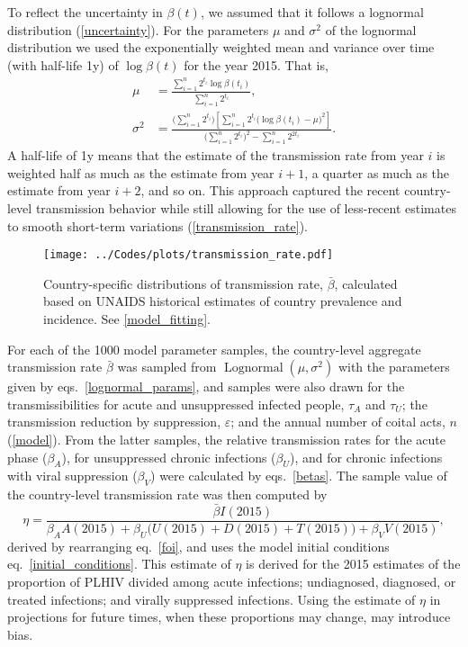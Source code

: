 \documentclass{article}
\DeclareMathOperator{\Lognormal}{Lognormal}
\begin{document}
To reflect the uncertainty in $\beta(t)$, we assumed that it follows a
lognormal distribution (\autoref{uncertainty}). For the parameters
$\mu$ and $\sigma^2$ of the lognormal distribution we used the
exponentially weighted mean and variance \cite{holt2004} over time
(with half-life 1\;y) of $\log \beta(t)$ for the year 2015.  That is,
\begin{equation}
  \label{lognormal_params}
  \begin{split}
    \mu &= \frac{\sum_{i = 1}^n  2^{t_i}
      \log \beta(t_i)}
    {\sum_{i = 1}^n 2^{t_i}},
    \\
    \sigma^2 &= \frac{\big(\sum_{i = 1}^n 2^{t_i}\big)
      \left[\sum_{i = 1}^n  2^{t_i}
        \big(\log \beta(t_i) - \mu\big)^2\right]}
    {\big(\sum_{i = 1}^n 2^{t_i}\big)^2
      - \sum_{i = 1}^n 2^{2 t_i}}.
  \end{split}
\end{equation}
A half-life of 1\;y means that the estimate of the transmission rate
from year $i$ is weighted half as much as the estimate from year
$i + 1$, a quarter as much as the estimate from year $i + 2$, and so
on.  This approach captured the recent country-level transmission
behavior while still allowing for the use of less-recent estimates to
smooth short-term variations (\autoref{transmission_rate}).

\begin{figure}
  \centering
  \texttt{[image: ../Codes/plots/transmission\_rate.pdf]}
  \caption{Country-specific distributions of transmission rate,
    $\bar{\beta}$, calculated based on UNAIDS historical estimates of
    country prevalence and incidence.  See \autoref{model_fitting}.}
  \label{transmission_rate}
\end{figure}

For each of the 1000 model parameter samples, the country-level
aggregate transmission rate $\bar{\beta}$ was sampled from
$\Lognormal(\mu, \sigma^2)$ with the parameters given by
eqs.~\eqref{lognormal_params}, and samples were also drawn for the
transmissibilities for acute and unsuppressed infected people,
$\tau_A$ and $\tau_U$; the transmission reduction by suppression,
$\varepsilon$; and the annual number of coital acts, $n$
(\autoref{model}).  From the latter samples, the relative transmission
rates for the acute phase ($\beta_A$), for unsuppressed chronic
infections ($\beta_U$), and for chronic infections with viral
suppression ($\beta_V$) were calculated by eqs.~\eqref{betas}.  The
sample value of the country-level transmission rate was then computed
by
\begin{equation}
  \label{eta}
  \eta = \frac{\bar{\beta} I(2015)}{
    \beta_A A(2015) + \beta_U \big(U(2015) + D(2015) + T(2015)\big)
    + \beta_V V(2015)},
\end{equation}
derived by rearranging eq.~\eqref{foi}, and uses the model initial
conditions eq.~\eqref{initial_conditions}.  This estimate of $\eta$ is
derived for the 2015 estimates of the proportion of PLHIV divided
among acute infections; undiagnosed, diagnosed, or treated infections;
and virally suppressed infections.  Using the estimate of $\eta$ in
projections for future times, when these proportions may change, may
introduce bias.
\end{document}
